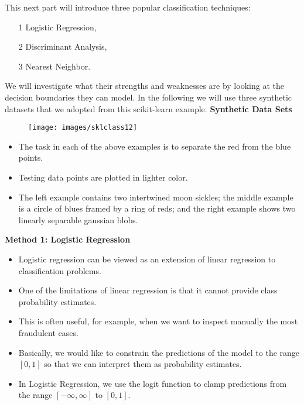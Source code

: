 \documentclass[SKL-MASTER.tex]{subfiles}
\begin{document}
\LARGE
\noindent This next part will introduce three popular classification techniques: 
\begin{itemize}
\item[1] Logistic Regression, 
\item[2] Discriminant Analysis, 
\item[3] Nearest Neighbor.
\end{itemize} We will investigate what their strengths and weaknesses are by looking at the decision boundaries they can model. In the following we will use three synthetic datasets that we adopted from this scikit-learn example.
\bigskip
\newpage
\textbf{Synthetic Data Sets}
\begin{figure}[h!]
\centering
\texttt{[image: images/sklclass12]}

\end{figure}

\begin{itemize}
\item The task in each of the above examples is to separate the red from the blue points. 
\item Testing data points are plotted in lighter color. 
\item The left example contains two intertwined moon sickles; the middle example is a circle of blues framed by a ring of reds; and the right example shows two linearly separable gaussian blobs.
\end{itemize}


\newpage
\textbf{Method 1: Logistic Regression}
\begin{itemize}
\item Logistic regression can be viewed as an extension of linear regression to classification problems. \item One of the limitations of linear regression is that it cannot provide class probability estimates. 
\item This is often useful, for example, when we want to inspect manually the most fraudulent cases. 
\item Basically, we would like to constrain the predictions of the model to the range $[0,1]$ so that we can interpret them as probability estimates. 
\item In Logistic Regression, we use the logit function to clamp predictions from the range $[-\infty,\infty]$ to $[0,1]$. 
\end{itemize}
\end{document}
